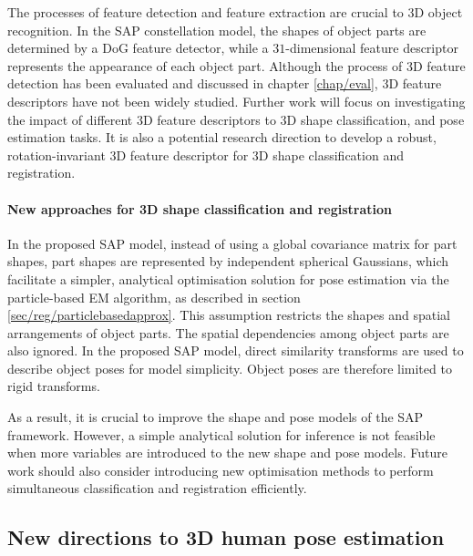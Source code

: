 The processes of feature detection and feature extraction are crucial to 3D object recognition. 
In the SAP constellation model, the shapes of object parts are determined by a DoG feature detector, while a $31$-dimensional feature descriptor represents the appearance of each object part.  
Although the process of 3D feature detection has been evaluated and discussed in chapter \ref{chap/eval}, 3D feature descriptors have not been widely studied.
Further work will focus on investigating the impact of different 3D feature descriptors to 3D shape classification, and pose estimation tasks. It is also a potential research direction to develop a robust, rotation-invariant 3D feature descriptor for 3D shape classification and registration.

\paragraph{New approaches for 3D shape classification and registration}

In the proposed SAP model, instead of using a global covariance matrix for part shapes, part shapes are represented by independent spherical Gaussians, which facilitate a simpler, analytical optimisation solution for pose estimation via the particle-based EM algorithm, as described in section \ref{sec/reg/particlebasedapprox}. 
This assumption restricts the shapes and spatial arrangements of object parts. 
The spatial dependencies among object parts are also ignored.  
In the proposed SAP model, direct similarity transforms are used to describe object poses for model simplicity. 
Object poses are therefore limited to rigid transforms.

As a result, it is crucial to improve the shape and pose models of the SAP framework. 
However, a simple analytical solution for inference is not feasible when more variables are introduced to the new shape and pose models. 
Future work should also consider introducing new optimisation methods to perform simultaneous classification and registration efficiently.

\subsection{New directions to 3D human pose estimation}

